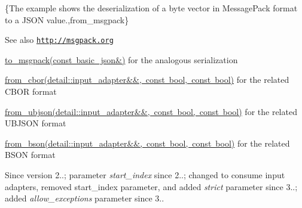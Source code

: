 \{The example shows the deserialization of a byte vector in Message\+Pack format to a J\+S\+ON value.,from\+\_\+msgpack\}

\begin{DoxySeeAlso}{See also}
\href{http://msgpack.org}{\tt http\+://msgpack.\+org} 

\mbox{\hyperlink{classnlohmann_1_1basic__json_a09ca1dc273d226afe0ca83a9d7438d9c}{to\+\_\+msgpack(const basic\+\_\+json\&)}} for the analogous serialization 

\mbox{\hyperlink{classnlohmann_1_1basic__json_a1d568ba1bd6978d80db42aa76626e2cf}{from\+\_\+cbor(detail\+::input\+\_\+adapter\&\&, const bool, const bool)}} for the related C\+B\+OR format 

\mbox{\hyperlink{classnlohmann_1_1basic__json_a1ed52b463d2ef14c85ed076467168c72}{from\+\_\+ubjson(detail\+::input\+\_\+adapter\&\&, const bool, const bool)}} for the related U\+B\+J\+S\+ON format 

\mbox{\hyperlink{classnlohmann_1_1basic__json_a0524486cd0b36a47448df882ec0d5e7b}{from\+\_\+bson(detail\+::input\+\_\+adapter\&\&, const bool, const bool)}} for the related B\+S\+ON format
\end{DoxySeeAlso}
\begin{DoxySince}{Since}
version 2..; parameter {\itshape start\+\_\+index} since 2..; changed to consume input adapters, removed start\+\_\+index parameter, and added {\itshape strict} parameter since 3..; added {\itshape allow\+\_\+exceptions} parameter since 3.. 
\end{DoxySince}
\mbox{\label{classnlohmann_1_1basic__json_a1ed52b463d2ef14c85ed076467168c72}} 
